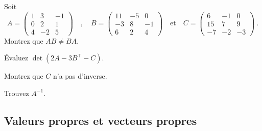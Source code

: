 \begin{question}
Soit
\[
A =
\begin{pmatrix}
1 & 3 & -1 \\
0 & 2 & 1 \\
4 & -2 & 5   
\end{pmatrix}
\quad , \quad
B =
\begin{pmatrix}
11 & -5 & 0 \\
-3 & 8 & -1 \\
6 & 2 & 4  
\end{pmatrix}
\quad \text{et} \quad
C =
\begin{pmatrix}
6 & -1 & 0 \\
15 & 7 & 9 \\
-7 & -2 & -3  
\end{pmatrix} \ .
\]
 Montrez que $AB \neq BA$.

 Évaluez $\det(2A-3B^\top-C)$.

 Montrez que $C$ n'a pas d'inverse.

 Trouvez $A^{-1}$.
\label{12Q10}
\end{question}

\subsection{Valeurs propres et vecteurs propres}

